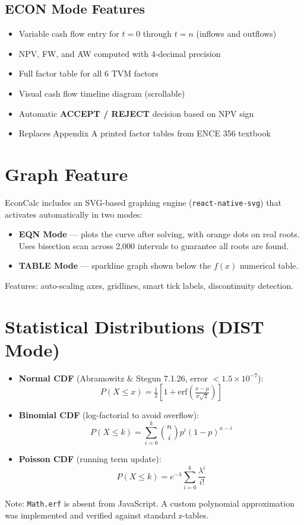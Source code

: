 \documentclass[12pt]{article}
\begin{document}
\subsection{ECON Mode Features}
\begin{tcolorbox}[featurebox,title=What ECON Mode provides]
\begin{itemize}[leftmargin=1.5em,nosep]
  \item Variable cash flow entry for $t=0$ through $t=n$ (inflows and outflows)
  \item NPV, FW, and AW computed with 4-decimal precision
  \item Full factor table for all 6 TVM factors
  \item Visual cash flow timeline diagram (scrollable)
  \item Automatic \textbf{ACCEPT / REJECT} decision based on NPV sign
  \item Replaces Appendix A printed factor tables from ENCE 356 textbook
\end{itemize}
\end{tcolorbox}

\section{Graph Feature}

EconCalc includes an SVG-based graphing engine (\texttt{react-native-svg}) that activates
automatically in two modes:
\begin{itemize}[leftmargin=1.5em]
  \item \textbf{EQN Mode} --- plots the curve after solving, with orange dots on real roots.
        Uses bisection scan across 2,000 intervals to guarantee all roots are found.
  \item \textbf{TABLE Mode} --- sparkline graph shown below the $f(x)$ numerical table.
\end{itemize}
Features: auto-scaling axes, gridlines, smart tick labels, discontinuity detection.

\section{Statistical Distributions (DIST Mode)}

\begin{itemize}[leftmargin=1.5em]
  \item \textbf{Normal CDF} (Abramowitz \& Stegun 7.1.26, error $<1.5\times10^{-7}$):
  \[P(X\leq x)=\tfrac{1}{2}\!\left[1+\mathrm{erf}\!\left(\tfrac{x-\mu}{\sigma\sqrt{2}}\right)\right]\]
  \item \textbf{Binomial CDF} (log-factorial to avoid overflow):
  \[P(X\leq k)=\sum_{i=0}^{k}\binom{n}{i}p^i(1-p)^{n-i}\]
  \item \textbf{Poisson CDF} (running term update):
  \[P(X\leq k)=e^{-\lambda}\sum_{i=0}^{k}\frac{\lambda^i}{i!}\]
\end{itemize}
Note: \texttt{Math.erf} is absent from JavaScript. A custom polynomial approximation
was implemented and verified against standard z-tables.
\end{document}
